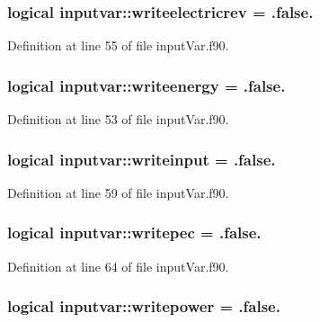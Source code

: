\hypertarget{classinputvar_afd3b4bc26c396eaba06cecc08717acf1}{
\subsubsection[{writeelectricrev}]{\setlength{\rightskip}{0pt plus 5cm}logical inputvar\-::writeelectricrev = .false.}}\label{classinputvar_afd3b4bc26c396eaba06cecc08717acf1}


Definition at line 55 of file input\-Var.\-f90.

\hypertarget{classinputvar_ae3e52c17a47fe8dd3e860abff881cfb0}{
\subsubsection[{writeenergy}]{\setlength{\rightskip}{0pt plus 5cm}logical inputvar\-::writeenergy = .false.}}\label{classinputvar_ae3e52c17a47fe8dd3e860abff881cfb0}


Definition at line 53 of file input\-Var.\-f90.

\hypertarget{classinputvar_a97c8b194b0db24c1c790d57bcc7b0f70}{
\subsubsection[{writeinput}]{\setlength{\rightskip}{0pt plus 5cm}logical inputvar\-::writeinput = .false.}}\label{classinputvar_a97c8b194b0db24c1c790d57bcc7b0f70}


Definition at line 59 of file input\-Var.\-f90.

\hypertarget{classinputvar_a81f46f9ef3ef3bdb78c79994791f3472}{
\subsubsection[{writepec}]{\setlength{\rightskip}{0pt plus 5cm}logical inputvar\-::writepec = .false.}}\label{classinputvar_a81f46f9ef3ef3bdb78c79994791f3472}


Definition at line 64 of file input\-Var.\-f90.

\hypertarget{classinputvar_ae3e0dfd2907bb36d0f62715b24f63536}{
\subsubsection[{writepower}]{\setlength{\rightskip}{0pt plus 5cm}logical inputvar\-::writepower = .false.}}\label{classinputvar_ae3e0dfd2907bb36d0f62715b24f63536}


